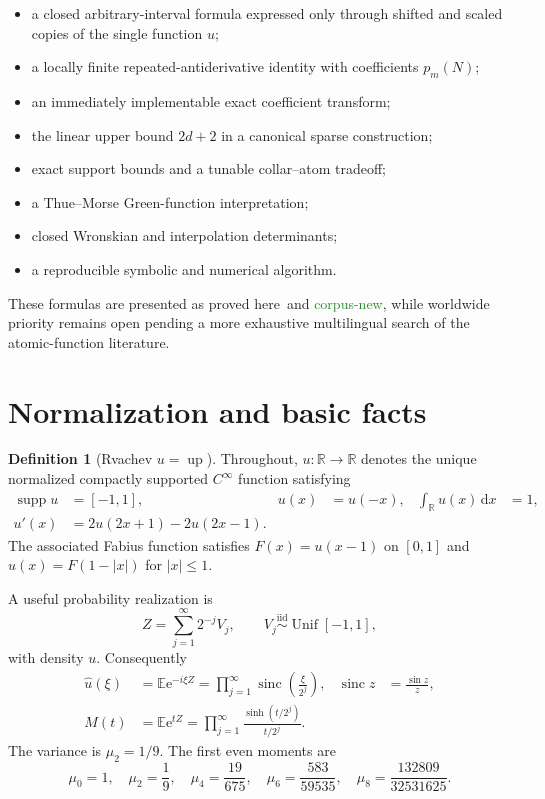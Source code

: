 \documentclass[11pt]{article}
\theoremstyle{definition}
\newtheorem{definition}[theorem]{Definition}
\theoremstyle{remark}
\DeclareMathOperator{\Up}{up}
\DeclareMathOperator{\supp}{supp}
\newcommand{\sinc}{\operatorname{sinc}}
\newcommand{\R}{\mathbb{R}}
\newcommand{\E}{\mathbb{E}}
\newcommand{\1}{\mathbf{1}}
\newcommand{\dd}{\,\mathrm{d}}
\newcommand{\e}{\mathrm{e}}
\newcommand{\CorpusNew}{\textcolor{ForestGreen}{\textsf{corpus-new}}}
\newcommand{\ProvedHere}{\textcolor{BrickRed}{\textsf{proved here}}}
\begin{document}
\begin{itemize}
\item a closed arbitrary-interval formula expressed only through shifted and
  scaled copies of the single function $u$;
\item a locally finite repeated-antiderivative identity with coefficients
  $p_m(N)$;
\item an immediately implementable exact coefficient transform;
\item the linear upper bound $2d+2$ in a canonical sparse construction;
\item exact support bounds and a tunable collar--atom tradeoff;
\item a Thue--Morse Green-function interpretation;
\item closed Wronskian and interpolation determinants;
\item a reproducible symbolic and numerical algorithm.
\end{itemize}

These formulas are presented as \ProvedHere\ and \CorpusNew, while worldwide
priority remains open pending a more exhaustive multilingual search of the
atomic-function literature.

\section{Normalization and basic facts}

\begin{definition}[Rvachev $u=\Up$]
Throughout, $u:\R\to\R$ denotes the unique normalized compactly supported
$C^\infty$ function satisfying
\begin{align}
 \supp u&=[-1,1], & u(x)&=u(-x), & \int_{\R}u(x)\dd x&=1,\label{eq:normalization}\\
 u'(x)&=2u(2x+1)-2u(2x-1).\label{eq:refinement-derivative}
\end{align}
The associated Fabius function satisfies $F(x)=u(x-1)$ on $[0,1]$ and
$u(x)=F(1-|x|)$ for $|x|\leq1$.
\end{definition}

A useful probability realization is
\begin{equation}
 Z=\sum_{j=1}^{\infty}2^{-j}V_j,
 \qquad V_j\stackrel{\mathrm{iid}}{\sim}\operatorname{Unif}[-1,1],
 \label{eq:random-Z}
\end{equation}
with density $u$.  Consequently
\begin{align}
 \widehat u(\xi)
 &=\E\e^{-i\xi Z}
 =\prod_{j=1}^{\infty}\sinc\!\left(\frac{\xi}{2^j}\right),
 &\sinc z&=\frac{\sin z}{z},\label{eq:fourier-product}\\
 M(t)
 &=\E\e^{tZ}
 =\prod_{j=1}^{\infty}\frac{\sinh(t/2^j)}{t/2^j}.
 \label{eq:mgf}
\end{align}
The variance is $\mu_2=1/9$.  The first even moments are
\begin{equation}
 \mu_0=1,\quad
 \mu_2=\frac19,\quad
 \mu_4=\frac{19}{675},\quad
 \mu_6=\frac{583}{59535},\quad
 \mu_8=\frac{132809}{32531625}.
 \label{eq:moments-first}
\end{equation}
\end{document}
